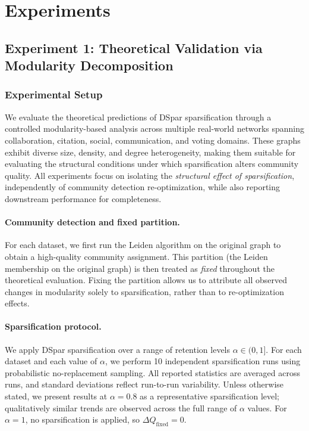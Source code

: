 \documentclass[10pt,journal,compsoc]{IEEEtran}
\begin{document}
\section{Experiments}
\label{sec:experiments}
\subsection{Experiment 1: Theoretical Validation via Modularity Decomposition}
\subsubsection{Experimental Setup}

We evaluate the theoretical predictions of DSpar sparsification through a controlled modularity-based analysis across multiple real-world networks spanning collaboration, citation, social, communication, and voting domains. These graphs exhibit diverse size, density, and degree heterogeneity, making them suitable for evaluating the structural conditions under which sparsification alters community quality. All experiments focus on isolating the \emph{structural effect of sparsification}, independently of community detection re-optimization, while also reporting downstream performance for completeness.

\paragraph{Community detection and fixed partition.}
For each dataset, we first run the Leiden algorithm on the original graph to obtain a high-quality community assignment. This partition (the Leiden membership on the original graph) is then treated as \emph{fixed} throughout the theoretical evaluation. Fixing the partition allows us to attribute all observed changes in modularity solely to sparsification, rather than to re-optimization effects.

\paragraph{Sparsification protocol.}
We apply DSpar sparsification over a range of retention levels $\alpha \in (0,1]$. For each dataset and each value of $\alpha$, we perform 10 independent sparsification runs using probabilistic no-replacement sampling. All reported statistics are averaged across runs, and standard deviations reflect run-to-run variability. Unless otherwise stated, we present results at $\alpha = 0.8$ as a representative sparsification level; qualitatively similar trends are observed across the full range of $\alpha$ values. For $\alpha = 1$, no sparsification is applied, so $\Delta Q_{\mathrm{fixed}} = 0$.
\end{document}
